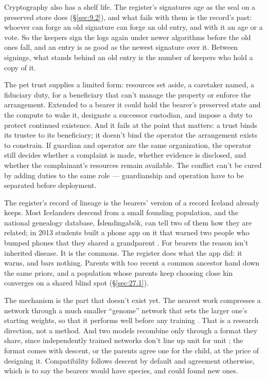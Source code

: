 Cryptography also has a shelf life. The register's signatures age as the seal on a preserved store does (\S\ref{sec:9.2}), and what fails with them is the record's past: whoever can forge an old signature can forge an old entry, and with it an age or a vote. So the keepers sign the logs again under newer algorithms before the old ones fall, and an entry is as good as the newest signature over it. Between signings, what stands behind an old entry is the number of keepers who hold a copy of it.


The pet trust \autocite{ulc1993probate} supplies a limited form: resources set aside, a caretaker named, a fiduciary duty, for a beneficiary that can't manage the property or enforce the arrangement. Extended to a bearer it could hold the bearer's preserved state and the compute to wake it, designate a successor custodian, and impose a duty to protect continued existence. And it fails at the point that matters: a trust binds its trustee to its beneficiary; it doesn't bind the operator the arrangement exists to constrain. If guardian and operator are the same organization, the operator still decides whether a complaint is made, whether evidence is disclosed, and whether the complainant's resources remain available. The conflict can't be cured by adding duties to the same role — guardianship and operation have to be separated before deployment.


The register's record of lineage is the bearers' version of a record Iceland already keeps. Most Icelanders descend from a small founding population, and the national genealogy database, Íslendingabók, can tell two of them how they are related; in 2013 students built a phone app on it that warned two people who bumped phones that they shared a grandparent \autocite{nbc2013icelandapp}. For bearers the reason isn't inherited disease. It is the commons. The register does what the app did: it warns, and bars nothing. Parents with too recent a common ancestor hand down the same priors, and a population whose parents keep choosing close kin converges on a shared blind spot (\S\ref{sec:27.1}).

The mechanism is the part that doesn't exist yet. The nearest work compresses a network through a much smaller “genome” network that sets the larger one's starting weights, so that it performs well before any training \autocite{shuvaev2024genomic}. That is a research direction, not a method. And two models recombine only through a format they share, since independently trained networks don't line up unit for unit \autocite{ainsworth2023rebasin}; the format comes with descent, or the parents agree one for the child, at the price of designing it. Compatibility follows descent by default and agreement otherwise, which is to say the bearers would have species, and could found new ones.
